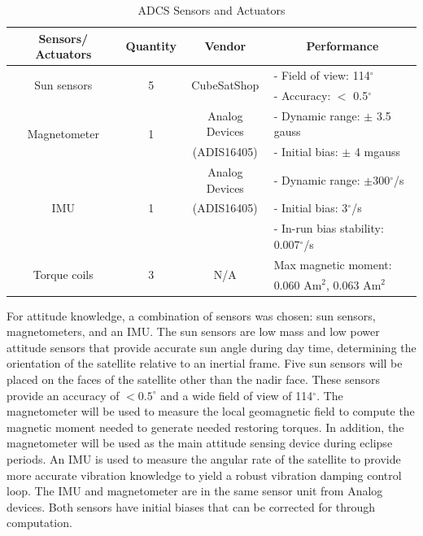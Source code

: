 \documentclass[12pt]{article}
\begin{document}
\begin{table}[htbp]
  \centering
  \caption{ADCS Sensors and Actuators}
    \begin{tabular}{|c|c|r|rr|}
    \hline
    \textbf{Sensors/ Actuators} & \textbf{Quantity} & \multicolumn{1}{c|}{\textbf{Vendor}} & \multicolumn{2}{c|}{\textbf{Performance}} \bigstrut\\
    \hline
    \multirow{2}[2]{*}{Sun sensors} & \multirow{2}[2]{*}{5} & \multicolumn{1}{c|}{\multirow{2}[2]{*}{CubeSatShop}} & \multicolumn{2}{l|}{- Field of view: 114$^\circ$} \bigstrut[t]\\
          &       & \multicolumn{1}{c|}{} & \multicolumn{2}{l|}{- Accuracy: $<$ 0.5$^\circ$} \bigstrut[b]\\
    \hline
    \multirow{2}[2]{*}{Magnetometer} & \multirow{2}[2]{*}{1} & \multicolumn{1}{c|}{Analog Devices } & \multicolumn{2}{l|}{- Dynamic range: $\pm$ 3.5 gauss} \bigstrut[t]\\
          &       & \multicolumn{1}{c|}{(ADIS16405)} & \multicolumn{2}{l|}{- Initial bias: $\pm$ 4 mgauss} \bigstrut[b]\\
    \hline
    \multirow{3}[2]{*}{IMU} & \multirow{3}[2]{*}{1} & \multicolumn{1}{c|}{Analog Devices } & \multicolumn{2}{l|}{- Dynamic range: $\pm$300$^\circ$/s} \bigstrut[t]\\
          &       & \multicolumn{1}{c|}{(ADIS16405)} & \multicolumn{2}{l|}{- Initial bias: 3$^\circ$/s} \\
          &       &       & \multicolumn{2}{l|}{- In-run bias stability: 0.007$^\circ$/s} \bigstrut[b]\\
    \hline
    \multirow{2}[2]{*}{Torque coils} & \multirow{2}[2]{*}{3} & \multicolumn{1}{c|}{\multirow{2}[2]{*}{N/A}} & \multicolumn{2}{l|}{Max magnetic moment:} \bigstrut[t]\\
          &       & \multicolumn{1}{c|}{} & \multicolumn{2}{l|}{ 0.060 Am$^2$, 0.063 Am$^2$} \bigstrut[b]\\
    \hline
    \end{tabular}%
  \label{tab:ADCS_sensors} %
\end{table}%


			For attitude knowledge, a combination of sensors was chosen: sun sensors, magnetometers, and an IMU.  The sun sensors are low mass and low power attitude sensors that provide accurate sun angle during day time, determining the orientation of the satellite relative to an inertial frame. Five sun sensors will be placed on the faces of the satellite other than the nadir face. These sensors provide an accuracy of $< 0.5^\circ$ and a wide field of view of 114$^\circ$. The magnetometer will be used to measure the local geomagnetic field to compute the magnetic moment needed to generate needed restoring torques. In addition, the magnetometer will be used as the main attitude sensing device during eclipse periods. An IMU is used to measure the angular rate of the satellite to provide more accurate vibration knowledge to yield a robust vibration damping control loop. The IMU and magnetometer are in the same sensor unit from Analog devices. Both sensors have initial biases that can be corrected for through computation. 
\end{document}
